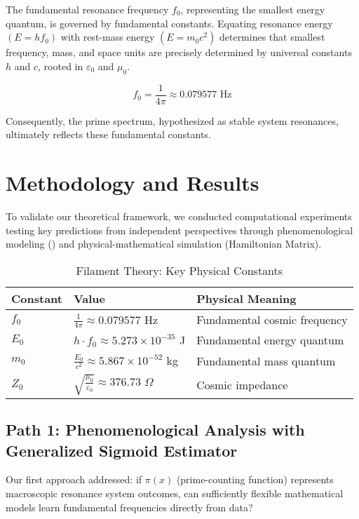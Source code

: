 \documentclass[11pt,a4paper]{article}
\newcommand{\GSE}{\text{GSE}}
\begin{document}
The fundamental resonance frequency $f_0$, representing the smallest energy quantum, is governed by fundamental constants. Equating resonance energy $(E = hf_0)$ with rest-mass energy $(E = m_0c^2)$ determines that smallest frequency, mass, and space units are precisely determined by universal constants $h$ and $c$, rooted in $\varepsilon_0$ and $\mu_0$.

\begin{equation}
f_0 = \frac{1}{4\pi} \approx 0.079577 \text{ Hz}
\end{equation}

Consequently, the prime spectrum, hypothesized as stable system resonances, ultimately reflects these fundamental constants.

\section{Methodology and Results}

To validate our theoretical framework, we conducted computational experiments testing key predictions from independent perspectives through phenomenological modeling (\GSE) and physical-mathematical simulation (Hamiltonian Matrix).

\begin{table}[h]
\centering
\caption{Filament Theory: Key Physical Constants}
\begin{tabular}{@{}lll@{}}
\toprule
\textbf{Constant} & \textbf{Value} & \textbf{Physical Meaning} \\
\midrule
$f_0$ & $\frac{1}{4\pi} \approx 0.079577$ Hz & Fundamental cosmic frequency \\
$E_0$ & $h \cdot f_0 \approx 5.273 \times 10^{-35}$ J & Fundamental energy quantum \\
$m_0$ & $\frac{E_0}{c^2} \approx 5.867 \times 10^{-52}$ kg & Fundamental mass quantum \\
$Z_0$ & $\sqrt{\frac{\mu_0}{\varepsilon_0}} \approx 376.73$ $\Omega$ & Cosmic impedance \\
\bottomrule
\end{tabular}
\label{tab:constants}
\end{table}

\subsection{Path 1: Phenomenological Analysis with Generalized Sigmoid Estimator}

Our first approach addressed: if $\pi(x)$ (prime-counting function) represents macroscopic resonance system outcomes, can sufficiently flexible mathematical models learn fundamental frequencies directly from data?
\end{document}
